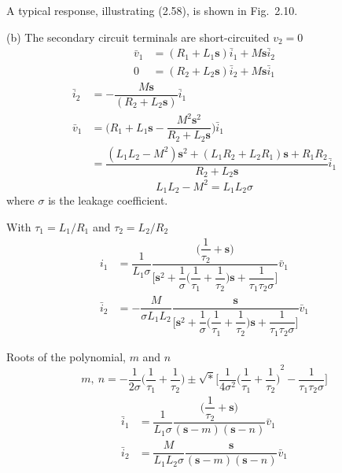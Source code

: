 \documentclass[a4paper,numbers=noenddot,12pt]{scrbook}
\begin{document}
A typical response, illustrating (2.58), is shown in Fig.\ 2.10.

\noindent(b) The secondary circuit terminals are short-circuited $v_2 = 0$
\begin{equation}
    \begin{aligned}
        \bar{v}_1 &= (R_1 + L_1\mathbf{s})\bar{i}_1 + M \mathbf{s} \bar{i}_2\\ %
        0  &= (R_2 + L_2 \mathbf{s})\bar{i}_2 + M \mathbf{s} \bar{i}_1 %
    \end{aligned}
    \label{eq:Eq2.59}
\end{equation}
\begin{align*}
    \bar{i}_2 & = - \dfrac{M \mathbf{s}}{(R_2 + L_2 \mathbf{s})} \bar{i}_1\\%
    \bar{v}_1 & = \Big( R_1 + L_1 \mathbf{s} - \dfrac{M^2 \mathbf{s}^2}{R_2 + L_2 \mathbf{s}}\Big) \bar{i}_1 \\%
    & = \dfrac{(L_1 L_2 - M^2) \mathbf{s}^2 +(L_1 R_2 + L_2 R_1) \mathbf{s} + R_1 R_2 }{R_2 + L_2 \mathbf{s}} \bar{i}_1 %
\end{align*}
\begin{equation*}
    L_1 L_2 - M^2 = L_1 L_2 \sigma
\end{equation*}
where $\sigma$ is the leakage coefficient.

With $\tau_1 = L_1 / R_1$ and $\tau_2 = L_2 / R_2$
\begin{align*}
    i_1 & = \dfrac{1}{L_1 \sigma} \dfrac{\Big( \dfrac{1}{\tau_2} + \mathbf{s}\Big)}{\Big[ \mathbf{s}^2 + \dfrac{1}{\sigma} \Big( \dfrac{1}{\tau_1} + \dfrac{1}{\tau_2}\Big)\mathbf{s} + \dfrac{1}{\tau_1 \tau_2 \sigma}\Big]} \bar{v}_1 \\ %
    \bar{i}_2 & = - \dfrac{M}{\sigma L_1 L_2} \dfrac{\mathbf{s}}{\Big[ \mathbf{s}^2 + \dfrac{1}{\sigma} \Big( \dfrac{1}{\tau_1} + \dfrac{1}{\tau_2}\Big)\mathbf{s} + \dfrac{1}{\tau_1 \tau_2 \sigma}\Big]} \bar{v}_1 %
\end{align*} 

Roots of the polynomial, $m$ and $n$
\begin{equation}
    m,\ n = - \dfrac{1}{2 \sigma} \Big(\dfrac{1}{\tau_1} + \dfrac{1}{\tau_2}\Big) \pm \sqrt*{\Big[ \dfrac{1}{4 \sigma^2} {\Big( \dfrac{1}{\tau_1} + \dfrac{1}{\tau_2} \Big)}^2 - \dfrac{1}{\tau_1 \tau_2 \sigma}\Big]}
    \label{eq:Eq2.60}
\end{equation}
\begin{equation}
    \begin{aligned}
        \bar{i}_1 & = \dfrac{1}{L_1 \sigma} \dfrac{\Big( \dfrac{1}{\tau_2} + \mathbf{s}\Big)}{(\mathbf{s} -m)(\mathbf{s} - n)} \bar{v}_1 \\ %
        \bar{i}_2 & = \dfrac{M}{L_1 L_2 \sigma} \dfrac{\mathbf{s}}{(\mathbf{s} -m)(\mathbf{s} - n)} \bar{v}_1  %
    \end{aligned}
    \label{eq:Eq2.61}
\end{equation}
\end{document}

